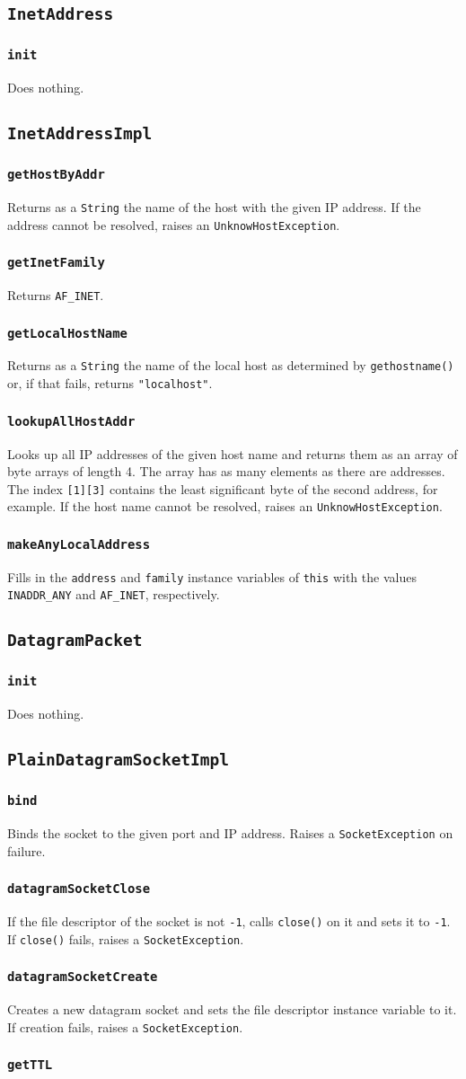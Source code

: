 \documentclass[twocolumn,a4paper]{article}      %
\newcommand{\class}[1]{\subsection{\texttt{#1}}}
\newcommand{\method}[1]{\subsubsection*{\texttt{#1}}}
\begin{document}
\class{InetAddress}

\method{init}

Does nothing.

\class{InetAddressImpl}

\method{getHostByAddr}

Returns as a \texttt{String} the name of the host with the given IP
address. If the address cannot be resolved, raises an
\texttt{UnknowHostException}.

\method{getInetFamily}

Returns \texttt{AF\_INET}.

\method{getLocalHostName}

Returns as a \texttt{String} the name of the local host as determined
by \texttt{gethostname()} or, if that fails, returns
\texttt{"localhost"}.

\method{lookupAllHostAddr}

Looks up all IP addresses of the given host name and returns them as
an array of byte arrays of length 4. The array has as many elements as
there are addresses. The index \texttt{[1][3]} contains the least
significant byte of the second address, for example. If the host name
cannot be resolved, raises an \texttt{UnknowHostException}.

\method{makeAnyLocalAddress}

Fills in the \texttt{address} and \texttt{family} instance variables
of \texttt{this} with the values \texttt{INADDR\_ANY} and
\texttt{AF\_INET}, respectively.

\class{DatagramPacket}

\method{init}

Does nothing.

\class{PlainDatagramSocketImpl}

\method{bind}

Binds the socket to the given port and IP address. Raises a
\texttt{SocketException} on failure.

\method{datagramSocketClose}

If the file descriptor of the socket is not \texttt{-1}, calls
\texttt{close()} on it and sets it to \texttt{-1}. If \texttt{close()}
fails, raises a \texttt{SocketException}.

\method{datagramSocketCreate}

Creates a new datagram socket and sets the file descriptor instance
variable to it. If creation fails, raises a \texttt{SocketException}.

\method{getTTL}
\end{document}
